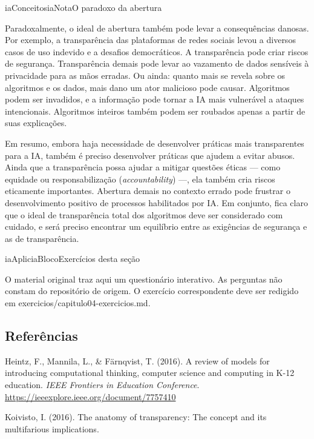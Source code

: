 \documentclass[
  11pt,
]{article}
\renewcommand{\texttt}[1]{{\color{iaAmeixa}\small\ttfamily #1}}
\newenvironment{nota}[1][Nota]{\begin{iabox}{iaConceitos}{iaNota}{#1}}{\end{iabox}}
\newenvironment{reflexao}[1][Para pensar]{\begin{iabox}{iaAplic}{iaBloco}{#1}}{\end{iabox}}
\begin{document}
\begin{nota}[O paradoxo da abertura]

Paradoxalmente, o ideal de abertura também pode levar a consequências
danosas. Por exemplo, a transparência das plataformas de redes sociais
levou a diversos casos de uso indevido e a desafios democráticos. A
transparência pode criar riscos de segurança. Transparência demais pode
levar ao vazamento de dados sensíveis à privacidade para as mãos
erradas. Ou ainda: quanto mais se revela sobre os algoritmos e os dados,
mais dano um ator malicioso pode causar. Algoritmos podem ser invadidos,
e a informação pode tornar a IA mais vulnerável a ataques intencionais.
Algoritmos inteiros também podem ser roubados apenas a partir de suas
explicações.

\end{nota}

Em resumo, embora haja necessidade de desenvolver práticas mais
transparentes para a IA, também é preciso desenvolver práticas que
ajudem a evitar abusos. Ainda que a transparência possa ajudar a mitigar
questões éticas --- como equidade ou responsabilização
(\emph{accountability}) ---, ela também cria riscos eticamente
importantes. Abertura demais no contexto errado pode frustrar o
desenvolvimento positivo de processos habilitados por IA. Em conjunto,
fica claro que o ideal de transparência total dos algoritmos deve ser
considerado com cuidado, e será preciso encontrar um equilíbrio entre as
exigências de segurança e as de transparência.

\begin{reflexao}[Exercícios desta seção]

O material original traz aqui um questionário interativo. As perguntas
não constam do repositório de origem. O exercício correspondente deve
ser redigido em \texttt{exercicios/capitulo04-exercicios.md}.

\end{reflexao}

\subsection{Referências}\label{referuxeancias}

Heintz, F., Mannila, L., \& Färnqvist, T. (2016). A review of models for
introducing computational thinking, computer science and computing in
K-12 education. \emph{IEEE Frontiers in Education Conference}.
\url{https://ieeexplore.ieee.org/document/7757410}

Koivisto, I. (2016). The anatomy of transparency: The concept and its
multifarious implications.
\end{document}
